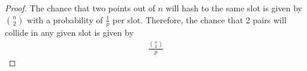 \documentclass[11pt]{article}
\begin{document}
\begin{enumerate}
\begin{enumerate}
\begin{proof}
The chance that two points out of $n$ will hash to the same slot is given by 
$n \choose 2$ with a probability of $\frac{1}{p}$ per slot.  
Therefore, the chance that 2 pairs will collide in any given slot is given by 
\begin{align*}
\frac{\binom{n}{2}}{p}
\end{align*}
\end{proof}
\end{enumerate}
\end{enumerate}
\end{document}
